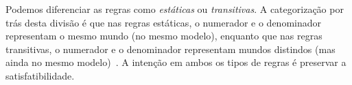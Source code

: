 Podemos diferenciar as regras como \textit{estáticas} ou \textit{transitivas}. A
categorização por trás desta divisão é que nas regras estáticas, o numerador e o
denominador representam o mesmo mundo (no mesmo
modelo), enquanto que nas regras transitivas, o numerador e o denominador
representam mundos distindos (mas ainda no mesmo
modelo)~\cite{clausal_tableaux}. A intenção em ambos os tipos de regras é
preservar a satisfatibilidade.

